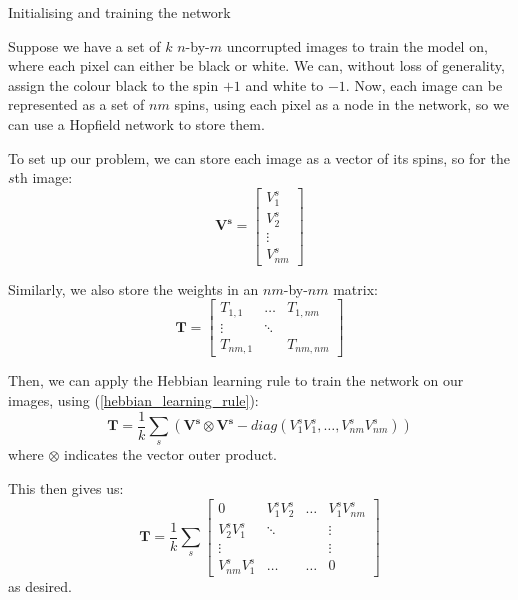 \documentclass[25pt, a0paper, portrait]{beamer}
\newlength{\colwidth}
\begin{document}
\begin{frame}[t]
\begin{columns}[t]
\begin{column}{\colwidth}
  \begin{block}{Initialising and training the network} \small

    Suppose we have a set of $k$ $n$-by-$m$ uncorrupted images to train the model on,
    where each pixel can either be black or white.
    We can, without loss of generality, assign the colour black to the spin $+1$
    and white to $-1$. Now, each image can be represented as a set of $nm$ spins, 
    using each pixel as a node in the network, so we can use a Hopfield network to 
    store them.

    To set up our problem, we can store each image as a vector of its spins, so for
    the $s$th image:
    \begin{equation*}
      \boldsymbol{V^s} = \begin{bmatrix}
        V^s_1 \\
        V^s_2 \\
        \vdots \\
        V^s_{nm}
      \end{bmatrix}
    \end{equation*}

    Similarly, we also store the weights in an $nm$-by-$nm$ matrix:
    \begin{equation*}
      \boldsymbol{T} = \begin{bmatrix}
        T_{1,1}   & \dots   & T_{1,nm}\\
        \vdots      & \ddots  & \\
        T_{nm,1}  &         & T_{nm,nm}
      \end{bmatrix}
    \end{equation*}

    Then, we can apply the Hebbian learning rule to train the network on our images, using
    (\ref{hebbian_learning_rule}):
    \begin{equation} \label{hebbian_simple_eq}
      \boldsymbol{T} = \frac{1}{k} \sum_{s}(\boldsymbol{V^s}\otimes\boldsymbol{V^s} - diag({V^s_1}{V^s_1}, \dots, {V^s_{nm}}{V^s_{nm}}))
    \end{equation}
    where $\otimes$ indicates the vector outer product.

    This then gives us:
    \begin{equation*}
      \boldsymbol{T} = \frac{1}{k} \sum_{s} \begin{bmatrix}
        0                 & {V^s_1}{V^s_2}  & \dots   & {V^s_1}{V^s_{nm}}\\
        {V^s_2}{V^s_1}    & \ddots          &         & \vdots \\
        \vdots            &                 &         & \vdots \\
        {V^s_{nm}}{V^s_1} & \dots           & \dots   & 0
      \end{bmatrix}
    \end{equation*}
    as desired.


\end{block}
\end{column}
\end{columns}
\end{frame}
\end{document}
